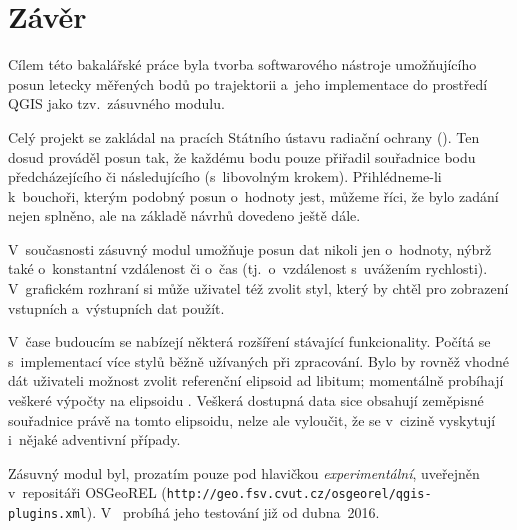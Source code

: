 \chapter{Závěr}
\label{zaver}

Cílem této bakalářské práce byla tvorba
softwarového nástroje umožňujícího posun letecky
měřených bodů po trajektorii a~jeho implementace
do prostředí QGIS jako tzv.~zásuvného modulu. 

Celý projekt se zakládal na pracích Státního
ústavu radiační ochrany (). Ten dosud prováděl posun
tak, že každému bodu pouze přiřadil souřadnice bodu
předcházejícího či následujícího (s~libovolným
krokem). Přihlédneme-li k~bouchoři, kterým podobný posun
o~hodnoty jest, můžeme říci, že bylo zadání
nejen splněno, ale na základě návrhů 
dovedeno ještě dále. 

V~současnosti zásuvný modul umožňuje posun dat
nikoli jen o~hodnoty, nýbrž také o~konstantní
vzdálenost či o~čas (tj.~o~vzdálenost
s~uvážením rychlosti). V~grafic\-kém
rozhraní si může uživatel též zvolit styl,
který by chtěl pro zobrazení vstupních
a~výstupních dat použít. 

V~čase budoucím se nabízejí některá rozšíření
stávající funkcionality. Počítá se s~implementací
více stylů běžně užívaných při zpracování. Bylo by
rovněž vhodné dát uživateli možnost zvolit
referenční elipsoid ad libitum; momentálně
probíhají veš\-keré výpočty na elipsoidu .
Veškerá dostupná data sice obsahují zeměpisné souřadnice
právě na tomto elipsoidu, nelze ale vyloučit, že
se v~cizině vyskytují i~nějaké adventivní případy.

Zásuvný modul byl, prozatím pouze pod hlavičkou \textit{experimentální},
uveřejněn v~repositáři OSGeoREL ({\tt http://geo.fsv.cvut.cz/osgeorel/qgis-plugins.xml}). V~ probíhá jeho testování již od dubna~2016.


